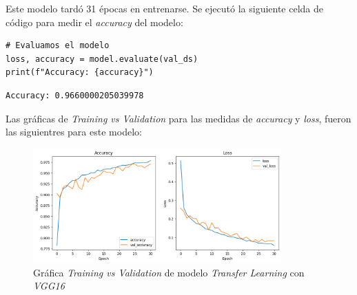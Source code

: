 Este modelo tardó 31 épocas en entrenarse. Se ejecutó la siguiente celda de código para medir el \textit{accuracy} del modelo:


\begin{lstlisting}[caption={Código para la impresión del \textit{accuracy} del modelo}]
# Evaluamos el modelo
loss, accuracy = model.evaluate(val_ds)
print(f"Accuracy: {accuracy}")
\end{lstlisting}


\begin{lstlisting}[caption={Impresión \textit{accuracy} del modelo}]
Accuracy: 0.9660000205039978
\end{lstlisting}

Las gráficas de \textit{Training vs Validation} para las medidas de \textit{accuracy} y \textit{loss}, fueron las siguientres para este modelo: 

\begin{figure}[H]
    \centering
    \includegraphics[width=0.85\textwidth]{Francisco/Imagenes resultados/TvsVCNN2.png} 
    \caption{Gráfica \textit{Training vs Validation} de modelo \textit{Transfer Learning} con \textit{VGG16}}
\end{figure}

\newpage

